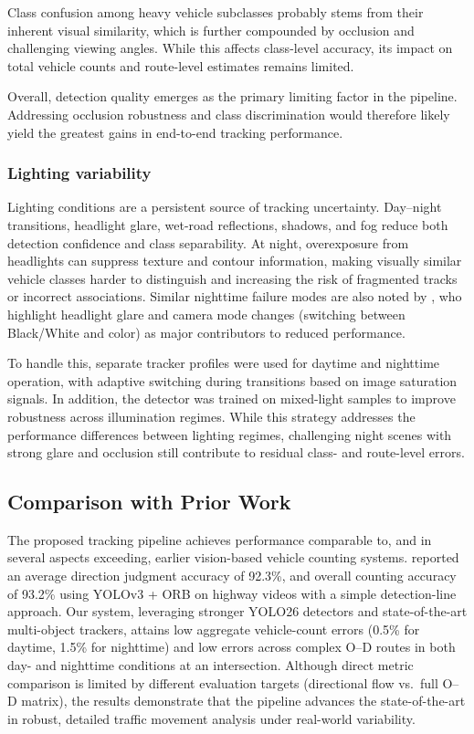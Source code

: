 Class confusion among heavy vehicle subclasses probably stems from their inherent visual similarity, which is further compounded by occlusion and challenging viewing angles. While this affects class-level accuracy, its impact on total vehicle counts and route-level estimates remains limited.

Overall, detection quality emerges as the primary limiting factor in the pipeline. Addressing occlusion robustness and class discrimination would therefore likely yield the greatest gains in end-to-end tracking performance.

\subsubsection{Lighting variability}
Lighting conditions are a persistent source of tracking uncertainty. Day--night transitions, headlight glare, wet-road reflections, shadows, and fog reduce both detection confidence and class separability. At night, overexposure from headlights can suppress texture and contour information, making visually similar vehicle classes harder to distinguish and increasing the risk of fragmented tracks or incorrect associations. Similar nighttime failure modes are also noted by \citet{Neupane2022RealTimeVehicle}, who highlight headlight glare and camera mode changes (switching between Black/White and color) as major contributors to reduced performance.

To handle this, separate tracker profiles were used for daytime and nighttime operation, with adaptive switching during transitions based on image saturation signals. In addition, the detector was trained on mixed-light samples to improve robustness across illumination regimes. While this strategy addresses the performance differences between lighting regimes, challenging night scenes with strong glare and occlusion still contribute to residual class- and route-level errors.

\subsection{Comparison with Prior Work}
The proposed tracking pipeline achieves performance comparable to, and in several aspects exceeding, earlier vision-based vehicle counting systems. \cite{Song2019VisionBasedVehicle} reported an average direction judgment accuracy of 92.3\%, and overall counting accuracy of 93.2\% using YOLOv3 + ORB on highway videos with a simple detection-line approach. Our system, leveraging stronger YOLO26 detectors and state-of-the-art multi-object trackers, attains low aggregate vehicle-count errors (0.5\% for daytime, 1.5\% for nighttime) and low errors across complex O–D routes in both day- and nighttime conditions at an intersection. Although direct metric comparison is limited by different evaluation targets (directional flow vs.\ full O–D matrix), the results demonstrate that the pipeline advances the state-of-the-art in robust, detailed traffic movement analysis under real-world variability.

